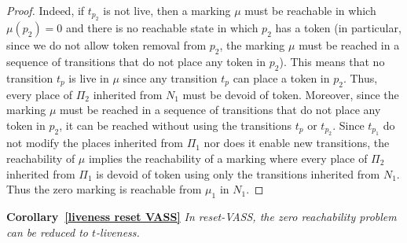 \begin{proof}
Indeed, if $t_{p_2}$ is not live, then a marking $\mu$ must be reachable in which $\mu(p_2) = 0$ and there is no reachable state in which $p_2$ has a token (in particular, since we do not allow token removal from $p_2$, the marking $\mu$ must be reached in a sequence of transitions that do not place any token in $p_2$).
This means that no transition $t_p$ is live in $\mu$ since any transition $t_p$ can place a token in $p_2$. 
Thus, every place of $\Pi_2$ inherited from $N_1$ must be devoid of token. Moreover, since the marking $\mu$ must be reached  in a sequence of transitions that do not place any token in $p_2$, 
it can be reached without using the transitions $t_p$ or $t_{p_2}$. Since $t_{p_1}$ do not modify the places inherited from $\Pi_1$ nor does it enable new transitions, the reachability of $\mu$ implies the reachability of a marking where every place of $\Pi_2$ inherited from $\Pi_1$ is devoid of token using only the transitions inherited from $N_1$. Thus the zero marking is reachable from $\mu_1$ in $N_1$.
\end{proof}

\noindent
\textbf{Corollary~\ref{liveness reset VASS}}
{\em In reset-VASS, the zero reachability problem can be reduced to {\sc $t$-liveness}.}







